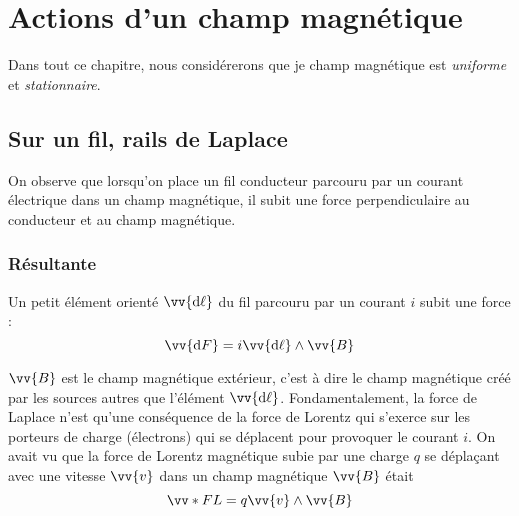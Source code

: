 \documentclass{cours}
\begin{document}
\setcounter{chapter}{23}
\chapter{Actions d'un champ magnétique}
Dans tout ce chapitre, nous considérerons que je champ magnétique est \emph{uniforme} et \emph{stationnaire}.

\section{Sur un fil, rails de Laplace}%
\label{sec:sur_un_fil}
On observe que lorsqu'on place un fil conducteur parcouru par un courant électrique dans un champ magnétique, il subit une force perpendiculaire au conducteur et au champ magnétique.

\subsection{Résultante}%
\label{sub:resultante}

Un petit élément orienté $\vv{\mathrm{d}\ell}$ du fil parcouru par un courant $i$  subit une force :
\begin{equation}
  \vv{\mathrm{d}F} = i\vv{\mathrm{d}\ell} \wedge \vv{B}
\end{equation}
\begin{center}

\end{center}
$\vv{B}$ est le champ magnétique extérieur, c'est à dire le champ magnétique créé par les sources autres que l'élément $\vv{\mathrm{d}\ell}$. Fondamentalement, la force de Laplace n'est qu'une conséquence de la force de Lorentz qui s'exerce sur les porteurs de charge (électrons) qui se déplacent pour provoquer le courant $i$. On avait vu que la force de Lorentz magnétique subie par une charge $q$ se déplaçant avec une vitesse $\vv{v}$ dans un champ magnétique $\vv{B}$ était 
\begin{equation}
  \vv*{F}{L} = q\vv{v}\wedge \vv{B}
\end{equation}
\end{document}
